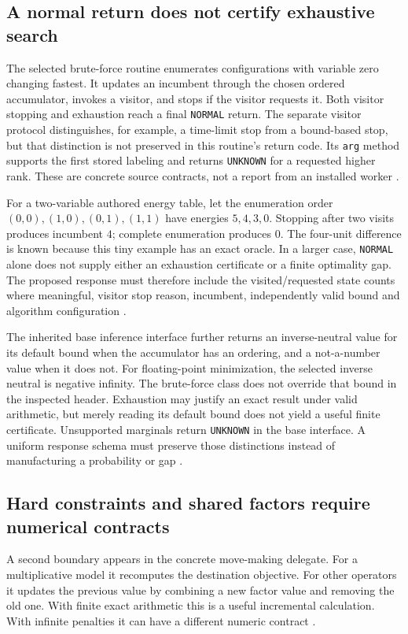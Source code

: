 \subsection{A normal return does not certify exhaustive search}
The selected brute-force routine enumerates configurations with variable
zero changing fastest. It updates an incumbent through the chosen ordered
accumulator, invokes a visitor, and stops if the visitor requests it. Both
visitor stopping and exhaustion reach a final \texttt{NORMAL} return.
The separate visitor protocol distinguishes, for example, a time-limit stop
from a bound-based stop, but that distinction is not preserved in this
routine's return code. Its \texttt{arg} method supports the first stored
labeling and returns \texttt{UNKNOWN} for a requested higher rank. These
are concrete source contracts, not a report from an installed worker
\citep{exec24_opengm_source}.

For a two-variable authored energy table, let the enumeration order
$(0,0),(1,0),(0,1),(1,1)$ have energies $5,4,3,0$. Stopping after two
visits produces incumbent $4$; complete enumeration produces $0$.
The four-unit difference is known because this tiny example has an exact
oracle. In a larger case, \texttt{NORMAL} alone does not supply either an
exhaustion certificate or a finite optimality gap. The proposed response
must therefore include the visited/requested state counts where meaningful,
visitor stop reason, incumbent, independently valid bound and algorithm
configuration \citep{exec24_opengm_choice}.

The inherited base inference interface further returns an inverse-neutral
value for its default bound when the accumulator has an ordering, and a
not-a-number value when it does not. For floating-point minimization,
the selected inverse neutral is negative infinity. The brute-force class
does not override that bound in the inspected header. Exhaustion may justify
an exact result under valid arithmetic, but merely reading its default bound
does not yield a useful finite certificate. Unsupported marginals return
\texttt{UNKNOWN} in the base interface. A uniform response schema must
preserve those distinctions instead of manufacturing a probability or gap
\citep{exec24_opengm_source}.

\subsection{Hard constraints and shared factors require numerical contracts}
A second boundary appears in the concrete move-making delegate. For a
multiplicative model it recomputes the destination objective. For other
operators it updates the previous value by combining a new factor value
and removing the old one. With finite exact arithmetic this is a useful
incremental calculation. With infinite penalties it can have a different
numeric contract \citep{exec24_opengm_source}.

